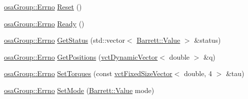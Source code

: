 \begin{DoxyCompactItemize}
\item 
\hyperlink{classosa_group_a3ac590c39198a7533838db29b01b994f}{osa\+Group\+::\+Errno} \hyperlink{classosa_group_aca7603d403c5379abafb02b4e5434851}{Reset} ()
\item 
\hyperlink{classosa_group_a3ac590c39198a7533838db29b01b994f}{osa\+Group\+::\+Errno} \hyperlink{classosa_group_a2533e5a1c10edc37ae7a5f4bb117a7ae}{Ready} ()
\item 
\hyperlink{classosa_group_a3ac590c39198a7533838db29b01b994f}{osa\+Group\+::\+Errno} \hyperlink{classosa_group_a2cba147e3ef62e2f6b902baf7857aa27}{Get\+Status} (std\+::vector$<$ \hyperlink{struct_barrett_a57ff132885344ca62e4b4b691885685b}{Barrett\+::\+Value} $>$ \&status)
\item 
\hyperlink{classosa_group_a3ac590c39198a7533838db29b01b994f}{osa\+Group\+::\+Errno} \hyperlink{classosa_group_af8a471763686871853417adf9282b95b}{Get\+Positions} (\hyperlink{classvct_dynamic_vector}{vct\+Dynamic\+Vector}$<$ double $>$ \&q)
\item 
\hyperlink{classosa_group_a3ac590c39198a7533838db29b01b994f}{osa\+Group\+::\+Errno} \hyperlink{classosa_group_a76dfcc394168160fa19f186b9ee4dd86}{Set\+Torques} (const \hyperlink{classvct_fixed_size_vector}{vct\+Fixed\+Size\+Vector}$<$ double, 4 $>$ \&tau)
\item 
\hyperlink{classosa_group_a3ac590c39198a7533838db29b01b994f}{osa\+Group\+::\+Errno} \hyperlink{classosa_group_ac6d7921d12038c833b6b0738c21588c9}{Set\+Mode} (\hyperlink{struct_barrett_a57ff132885344ca62e4b4b691885685b}{Barrett\+::\+Value} mode)
\end{DoxyCompactItemize}
